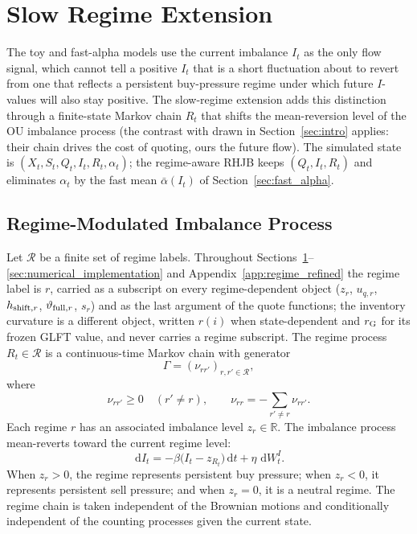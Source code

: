 \documentclass[11pt,a4paper]{article}
\newcommand{\dd}{\,\mathrm{d}}
\newcommand{\alphabar}{\bar\alpha}
\theoremstyle{plain}
\theoremstyle{definition}
\begin{document}
\FloatBarrier

\section{Slow Regime Extension}
\label{sec:regime}

The toy and fast-alpha models use the current imbalance \(I_t\) as the only
flow signal, which cannot tell a positive \(I_t\) that is a short fluctuation
about to revert from one that reflects a persistent buy-pressure regime under
which future \(I\)-values will also stay positive.  The slow-regime extension
adds this distinction through a finite-state Markov chain \(R_t\) that shifts
the mean-reversion level of the OU imbalance process (the contrast with
\cite{GuilbaudPham2013} drawn in Section~\ref{sec:intro} applies: their chain
drives the cost of quoting, ours the future flow).  The simulated state is
\((X_t,S_t,Q_t,I_t,R_t,\alpha_t)\); the regime-aware RHJB keeps
\((Q_t,I_t,R_t)\) and eliminates \(\alpha_t\) by the fast mean
\(\alphabar(I_t)\) of Section~\ref{sec:fast_alpha}.

\subsection{Regime-Modulated Imbalance Process}
\label{subsec:regime_process}

Let \(\mathcal R\) be a finite set of regime labels.  Throughout
Sections~\ref{sec:regime}--\ref{sec:numerical_implementation} and
Appendix~\ref{app:regime_refined} the regime label is \(r\), carried as a
subscript on every regime-dependent object (\(z_r\), \(u_{q,r}\),
\(h_{{\rm shift},r}\), \(\vartheta_{{\rm full},r}\), \(s_r\)) and as the last
argument of the quote functions; the inventory curvature is a different object,
written \(r(i)\) when state-dependent and \(r_{\rm G}\) for its frozen GLFT
value, and never carries a regime subscript.  The regime process
\(R_t\in\mathcal R\) is a
continuous-time Markov chain with generator
\[
\Gamma=(\nu_{rr'})_{r,r'\in\mathcal R},
\]
where
\[
\nu_{rr'}\ge0\quad(r'\ne r),
\qquad
\nu_{rr}=-\sum_{r'\ne r}\nu_{rr'}.
\]
Each regime \(r\) has an associated imbalance level \(z_r\in\mathbb R\).  The
imbalance process mean-reverts toward the current regime level:
\begin{equation}
\dd I_t
=
-\beta\bigl(I_t-z_{R_t}\bigr)\dd t+\eta\,\dd W^I_t.
\label{eq:regime_y_dynamics}
\end{equation}
When \(z_r>0\), the regime represents persistent buy pressure; when
\(z_r<0\), it represents persistent sell pressure; and when \(z_r=0\), it is a
neutral regime.  The regime chain is taken independent of the Brownian motions
and conditionally independent of the counting processes given the current
state.
\end{document}
